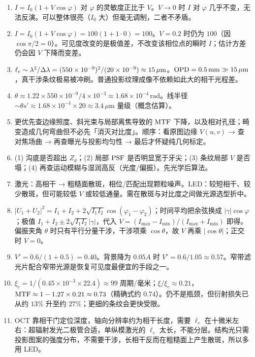 \begin{enumerate}
  \item $I=I_0(1+V\cos\varphi)$ 对 $\varphi$ 的灵敏度正比于 $V$。$V\to0$ 时 $I$ 对 $\varphi$ 几乎不变，无法反演。可以整体很亮（$I_0$ 大）但毫无调制，二者不矛盾。
  \item $I=I_0(1+V\cos\varphi)=100(1+1\cdot0)=100$。$V=0.2$ 时仍为 $100$（因 $\cos\pi/2=0$）。可见度改变的是极值差，不改变该相位点的瞬时 $I$；估计方差仍会因 $V$ 下降而变差。
  \item $\ell_c\sim\lambda^{2}/\Delta\lambda=(550\times10^{-9})^{2}/(20\times10^{-9})\approx15\,\mu\mathrm{m}$。$\mathrm{OPD}=0.5\,\mathrm{mm}\gg15\,\mu\mathrm{m}$，真干涉条纹极易被冲刷。普通投影纹理成像不依赖如此大的相干光程差。
  \item $\theta\approx1.22\times550\times10^{-9}/4\times10^{-3}\approx1.68\times10^{-4}\,\mathrm{rad}$。线半径 $\sim\theta s'\approx1.68\times10^{-4}\times20\approx3.4\,\mu\mathrm{m}$ 量级（概念估算）。
  \item 更优先查边缘照度、斜光束与局部离焦导致的 $\mathrm{MTF}$ 下降，以及相对孔径；畸变造成几何弯曲但不必先「消灭对比度」。顺序：看原图边缘 $V(u,v)$ → 查对焦场曲 → 再查曝光与投影均匀性 → 最后才怀疑纯几何标定。
  \item (1) 沟底是否超出 $Z_d$；(2) 局部 $\mathrm{PSF}$ 是否明显宽于牙尖；(3) 条纹局部 $V$ 是否塌；(4) 再查运动模糊与湿润高反（光度/偏振）。先光学后算法。
  \item 激光：高相干 → 粗糙面散斑，相位/匹配出现颗粒噪声。LED：较短相干、较少散斑，但可能较低 $V$ 或较低通量。需在散斑与对比度之间做光源选型折中。
  \item $|U_1+U_2|^2=I_1+I_2+2\sqrt{I_1I_2}\cos(\varphi_1-\varphi_2)$；时间平均把余弦换成 $|\gamma|\cos\varphi$；极值 $I_1+I_2\pm2\sqrt{I_1I_2}|\gamma|$，代入 $V=(I_{\max}-I_{\min})/(I_{\max}+I_{\min})$ 即得。偏振夹角 $\theta$ 时只有平行分量干涉，干涉项乘 $\cos\theta$，故 $V$ 再乘 $|\cos\theta|$；正交时 $V=0$。
  \item $V'=0.6/(1+0.5)=0.40$。背景降为 $0.05A$ 时 $V'=0.6/1.05\approx0.57$。窄带滤光片配合窄带光源是恢复可见度最便宜的手段之一。
  \item $\xi_c=1/(0.45\times10^{-3}\times22.4)\approx99$ 周期/毫米；$\xi/\xi_c\approx0.21$，$\mathrm{MTF}\approx1-1.27\times0.21\approx0.73$（精确式约 $0.74$）。仍不是瓶颈，但衍射损失已从约 $13\%$ 升至约 $27\%$；更细的条纹会更快受限。
  \item OCT 靠相干门定位深度，轴向分辨率约为相干长度，需要 $\ell_c$ 在十微米左右：超辐射发光二极管合适，单纵模激光的 $\ell_c$ 太长，不能分层。结构光只需投影图案的强度分布，不需要干涉，长相干反而在粗糙面上产生散斑，所以多用 LED。
\end{enumerate}
